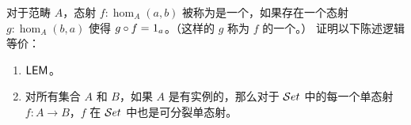 \begin{ex}\label{ex:monos-are-split-monos-iff-LEM-holds}
  对于范畴 $A$，态射 $f: \hom_A(a,b)$ 被称为是一个，如果存在一个态射 $g: \hom_A(b,a)$ 使得 $g \circ f =_{} 1_a$。（这样的 $g$ 称为 $f$ 的一个。）
  证明以下陈述逻辑等价：
  \begin{enumerate}
  \item $\mathsf{LEM}_{}$。
  \item 对所有集合 $A$ 和 $B$，如果 $A$ 是有实例的，那么对于 $\mathcal{S}et$ 中的每一个单态射 $f: A \to B$，$f$ 在 $\mathcal{S}et$ 中也是可分裂单态射。
  \end{enumerate}
\end{ex}

%

